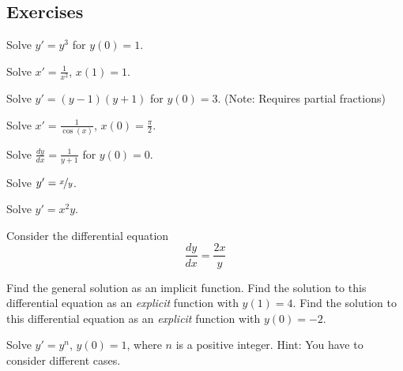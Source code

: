 \subsection{Exercises}

\begin{exercise}
Solve $y' = y^3$ for $y(0)=1$.
\end{exercise}

\begin{exercise}\ansMark%
Solve $x' = \frac{1}{x^2}$, $x(1)=1$.
\end{exercise}


\begin{exercise}
Solve $y' = (y-1)(y+1)$ for $y(0)=3$. (Note: Requires partial fractions)
\end{exercise}

\begin{exercise}\ansMark%
Solve $x' = \frac{1}{\cos(x)}$, $x(0)=\frac{\pi}{2}$.
\end{exercise}


\begin{exercise}
Solve $\frac{dy}{dx} = \frac{1}{y+1}$ for $y(0)=0$.
\end{exercise}

\begin{exercise}
Solve $y' = \nicefrac{x}{y}$.
\end{exercise}

\begin{exercise}
Solve $y' = x^2y$.
\end{exercise}

\begin{exercise}\ansMark%
Consider the differential equation \[ \frac{dy}{dx} = \frac{2x}{y} \]
\begin{tasks}
\task Find the general solution as an implicit function.
\task Find the solution to this differential equation as an \emph{explicit} function with $y(1) = 4$.
\task Find the solution to this differential equation as an \emph{explicit} function with $y(0) = -2$. 
\end{tasks}
\end{exercise}

\begin{exercise}\ansMark
Solve $y' = y^n$, $y(0) = 1$, where $n$ is a positive integer.
Hint: You have to consider different cases.
\end{exercise}


